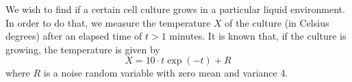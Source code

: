 \begin{solution}
\end{solution}

\else
\question[25] %

We wish to find if a certain cell culture grows in a particular liquid environment. In order to do that, we measure the temperature $X$ of the culture (in Celsius degrees) after an elapsed time of $t > 1$ minutes. It is known that, if the culture is growing, the temperature is given by 
$$ X = 10 \cdot t \exp(-t) + R$$
where $R$ is a noise random variable with zero mean and variance 4.

